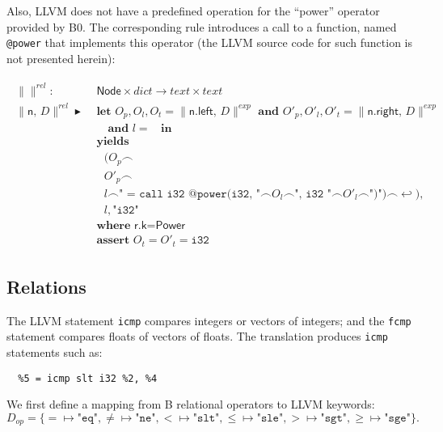 \documentclass{article}
\newcommand{\trad}[2]{\ensuremath{\lVert \textsf{#1} \rVert^{\textit{#2}}}}
\newcommand{\nl}[0]{\ensuremath{\hookleftarrow}}
\DeclareMathOperator{\conc}{\smallfrown}
\DeclareMathOperator{\isdef}{\blacktriangleright}
\DeclareMathOperator{\name}{\mathcal{L}()}
\begin{document}
Also, LLVM does not have a predefined operation for the ``power''
operator provided by B0. The corresponding rule introduces a call
to a function, named \texttt{@power} that implements this operator (the LLVM source code
for such function is not presented herein):
\begin{framed}
\begin{align}
\begin{split}
 \trad{}{rel} : & \textsf{ Node} \times dict  \rightarrow text \times text \\
  \trad{n, $D$}{rel} \isdef & \textbf{ let } O_p, O_l, O_t =
  \trad{n.left, $D$}{exp} \textbf{ and }
  O'_p, O'_l, O'_t = \trad{n.right, $D$}{exp} \\
  & \quad \textbf{ and } l = \name \textbf{ in } \\
  & \textbf{ yields} \\
  & \quad (O_p \conc \\
  & \quad O'_p \conc \\
  & \quad l \conc \texttt{" = call i32 @power(i32, "} \conc O_l \conc \texttt{", i32 "} \conc O'_l \conc \texttt{")"}) \conc \nl), \\
  & \quad l, \texttt{"i32"} \\
  & \textbf{ where } \textsf{r.k} = \textsf{Power} \\
  & \textbf{ assert } O_t = O'_t = \texttt{i32}
\end{split}
\end{align}
\end{framed}

\subsection{Relations}
\label{sec:rel}

The LLVM statement \texttt{icmp} compares integers or vectors of integers;
and the \texttt{fcmp} statement compares floats of vectors of floats. The
translation produces \texttt{icmp} statements such as:
\begin{verbatim}
  %5 = icmp slt i32 %2, %4
\end{verbatim}

We first define a mapping from B relational operators to LLVM
keywords:
$$D_{op} = \{ = \mapsto \texttt{"eq"}, 
  \ne \mapsto \texttt{"ne"}, 
  < \mapsto \texttt{"slt"}, 
  \le \mapsto \texttt{"sle"}, 
  > \mapsto \texttt{"sgt"}, 
  \ge \mapsto \texttt{"sge"} \}.$$
\end{document}
